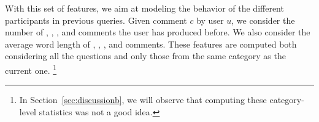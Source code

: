 With this set of features, we aim at modeling the behavior of the different 
participants in previous queries. Given comment $c$ by user $u$, we consider 
the number of \good, \bad, \pot, and \dial comments the user has produced 
before. 
We also consider the average word length of \good, \bad, \pot, and \dial 
comments. These features are computed both considering all the questions and 
only those from the same category as the current one.%
\footnote{In Section~\ref{sec:discussionb}, we will observe that computing 
these category-level statistics was not a good idea.}





